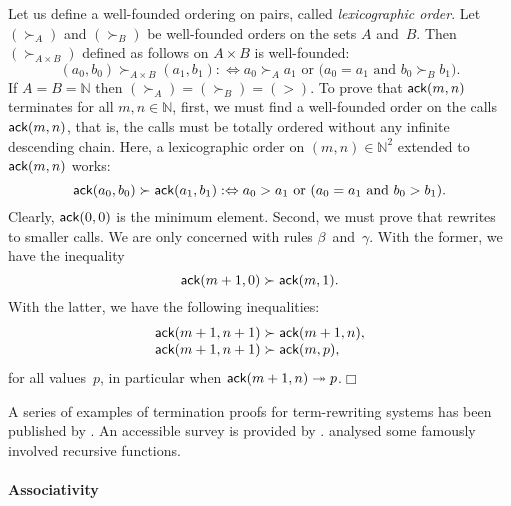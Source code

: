 Let us define a well\hyp{}founded ordering on pairs, called
\emph{lexicographic order}. Let
\((\succ_A)\) and \((\succ_B)\) be well\hyp{}founded orders on the
sets \(A\) and~\(B\). Then \((\succ_{A \times B})\) defined as follows
on \(A \times B\) is well\hyp{}founded:
\begin{equation}
(a_0,b_0) \succ_{A \times B} (a_1,b_1) :\Leftrightarrow \text{\(a_0
    \succ_A a_1\) or (\(a_0 = a_1\) and \(b_0 \succ_B b_1\)).}
\label{def:lexico}
\end{equation}
If \(A=B=\mathbb{N}\) then \((\succ_A) = (\succ_B) = (>)\). To prove
that \(\textsf{ack}(m,n)\) terminates for all \(m,n \in \mathbb{N}\),
first, we must find a well\hyp{}founded order on the calls
\(\textsf{ack}(m,n)\), that is, the calls must be totally ordered without
any infinite descending chain. Here, a lexicographic order on \((m,n)
\in \mathbb{N}^2\) extended to \(\textsf{ack}(m,n)\) works:
\begin{equation*}
\textsf{ack}(a_0,b_0) \succ \textsf{ack}(a_1,b_1) :\Leftrightarrow
\text{\(a_0 > a_1\) or (\(a_0 = a_1\) and \(b_0 > b_1\)).}
\end{equation*}
Clearly, \(\textsf{ack}(0,0)\) is the minimum element. Second, we must
prove that  rewrites to smaller calls. We are only
concerned with rules \(\beta\)~and~\(\gamma\). With the former, we
have the inequality
\begin{equation*}
  \textsf{ack}(m+1,0) \succ \textsf{ack}(m,1).
\end{equation*}
With the latter, we have the following inequalities:
\begin{equation*}
  \begin{array}{@{}r@{\;}l@{\;}l@{}}
    \fun{ack}(m+1,n+1) & \succ & \fun{ack}(m+1,n),\\
    \fun{ack}(m+1,n+1) & \succ & \fun{ack}(m,p),
  \end{array}
\end{equation*}
for all values~\(p\), in particular when \(\textsf{ack}(m+1,n)
\twoheadrightarrow p\).\hfill\(\Box\)

A series of examples of termination proofs for term\hyp{}rewriting systems has been
published by \cite{Dershowitz_1995,ArtsGiesl_2001}. An accessible
survey is provided by \cite{Dershowitz_1987}. \cite{Knuth_2000a}
analysed some famously involved recursive functions.

\paragraph{Associativity}
\label{proof:assoc_cat}

